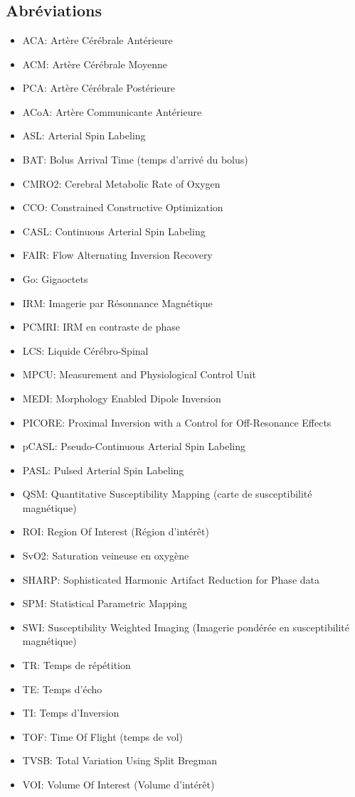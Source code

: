 \chapter*{}
\vspace{-4 cm}
\section*{Abréviations}
\begin{itemize}
\item ACA:	Artère Cérébrale Antérieure
\item ACM:	Artère Cérébrale Moyenne
\item PCA:	Artère Cérébrale Postérieure
\item ACoA:	Artère Communicante Antérieure
\item ASL:	Arterial Spin Labeling
\item BAT:	Bolus Arrival Time (temps d'arrivé du bolus)
\item CMRO2:	Cerebral Metabolic Rate of Oxygen
\item CCO:	Constrained Constructive Optimization 
\item CASL:	Continuous Arterial Spin Labeling
\item FAIR:	Flow Alternating Inversion Recovery
\item Go:	Gigaoctets
\item IRM:	Imagerie par Résonnance Magnétique
\item PCMRI:	IRM en contraste de phase
\item LCS:	Liquide Cérébro-Spinal
\item MPCU:	Measurement and Physiological Control Unit 
\item MEDI:	Morphology Enabled Dipole Inversion
\item PICORE:	Proximal Inversion with a Control for Off-Resonance Effects
\item pCASL:	Pseudo-Continuous Arterial Spin Labeling
\item PASL:	Pulsed Arterial Spin Labeling
\item QSM:	Quantitative Susceptibility Mapping (carte de susceptibilité magnétique)
\item ROI:	Region Of Interest (Région d'intérêt)
\item SvO2:	Saturation veineuse en oxygène
\item SHARP:	Sophisticated Harmonic Artifact Reduction for Phase data
\item SPM:	Statistical Parametric Mapping 
\item SWI:	Susceptibility Weighted Imaging (Imagerie pondérée en susceptibilité magnétique)
\item TR:	Temps de répétition
\item TE:	Temps d'écho
\item TI:	Temps d'Inversion
\item TOF:	Time Of Flight (temps de vol)
\item TVSB:	Total Variation Using Split Bregman
\item VOI:	Volume Of Interest (Volume d'intérêt)
\end{itemize}
